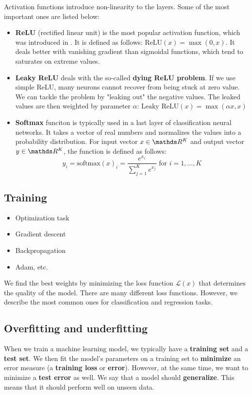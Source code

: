 Activation functions introduce non-linearity to the layers. Some of the most important ones are listed below:
\begin{itemize}
\item \textbf{ReLU} (rectified linear unit) is the most popular activation function, which was introduced in \cite{pmlr-v15-glorot11a}. It is defined as follows: $\text{ReLU}(x) = \max(0, x)$. It deals better with vanishing gradient than sigmoidal functions, which tend to saturates on extreme values.
\item \textbf{Leaky ReLU} deals with the so-called \textbf{dying ReLU problem}. If we use simple ReLU, many neurons cannot recover from being stuck at zero value. We can tackle the problem by "leaking out" the negative values. The leaked values are then weighted by parameter $\alpha$: $\text{Leaky ReLU}(x) = \max(\alpha x, x)$
\item \textbf{Softmax} funciton is typically used in a last layer of classification neural networks. It takes a vector of real numbers and normalizes the values into a probability distribution. For input vector $x \in \real^K$ and output vector $y \in \real^K$, the function is defined as follows:
$$
    y_i = \text{softmax}(x)_i = \frac{e^{x_i}}{\sum\limits^{K}_{j = 1} e^{x_j}} \text{ for } i = 1,...,K
$$
\end{itemize}

\subsection{Training}
\label{sec:training}
\begin{itemize}
    \item Optimization task
    \item Gradient descent
    \item Backpropagation
    \item Adam, etc.
\end{itemize}
We find the best weights by minimizing the loss function $\mathcal{L}(x)$ that determines the quality of the model. There are many different loss functions. However, we describe the most common ones for classification and regression tasks.



\subsection{Overfitting and underfitting}

When we train a machine learning model, we typically have a \textbf{training set} and a \textbf{test set}. We then fit the model's parameters on a training set to \textbf{minimize} an error measure (a \textbf{training loss} or \textbf{error}). However, at the same time, we want to minimize a \textbf{test error} as well. We say that a model should \textbf{generalize}. This means that it should perform well on unseen data.

